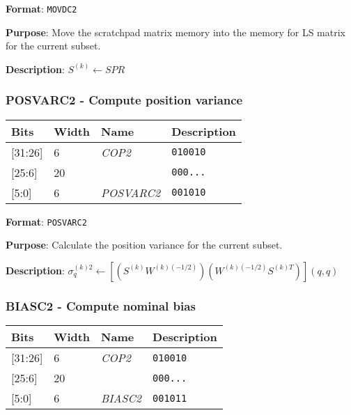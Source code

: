 \documentclass[11pt]{article}
\begin{document}
\textbf{Format}: \texttt{MOVDC2}

\textbf{Purpose}: Move the scratchpad matrix memory into the memory for LS matrix for the current subset.

\textbf{Description}: $S^{(k)} \leftarrow SPR$

\text{}
\subsubsection{POSVARC2 - Compute position variance}
\text{}

\begin{table}[H] \centering
  \def\arraystretch{1.4}
  \begin{tabular}{|m{2cm}|m{1.5cm}|m{2.5cm}|m{4.5cm}|}
    \hline
    \textbf{Bits} & \textbf{Width} & \textbf{Name} & \textbf{Description}\\ \hline

    [31:26] & 6 & \emph{COP2} & \texttt{010010}\\ \hline

    [25:6] & 20 & & \texttt{000...}\\ \hline

    [5:0] & 6 & \emph{POSVARC2} & \texttt{001010}\\ \hline
  \end{tabular}
\end{table}

\textbf{Format}: \texttt{POSVARC2}

\textbf{Purpose}: Calculate the position variance for the current subset.

\textbf{Description}: $\sigma_q^{(k)2} \leftarrow [(S^{(k)}W^{(k)(-1/2)})(W^{(k)(-1/2)}S^{(k)T})](q,q)$

\text{}
\subsubsection{BIASC2 - Compute nominal bias}
\text{}

\begin{table}[H] \centering
  \def\arraystretch{1.4}
  \begin{tabular}{|m{2cm}|m{1.5cm}|m{2.5cm}|m{4.5cm}|}
    \hline
    \textbf{Bits} & \textbf{Width} & \textbf{Name} & \textbf{Description}\\ \hline

    [31:26] & 6 & \emph{COP2} & \texttt{010010}\\ \hline

    [25:6] & 20 & & \texttt{000...}\\ \hline

    [5:0] & 6 & \emph{BIASC2} & \texttt{001011}\\ \hline
  \end{tabular}
\end{table}
\end{document}
